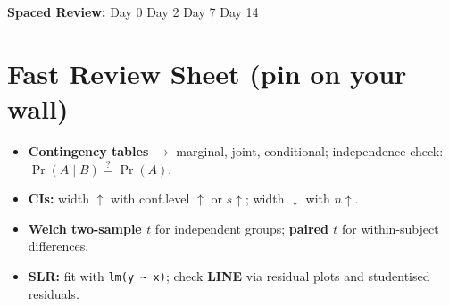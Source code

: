 \documentclass[11pt,a4paper]{article}
\newcommand{\reviewticks}{
  \vspace{0.4em}
  \noindent\scriptsize\textbf{Spaced Review:}
  \fbox{\phantom{D0}} Day 0\quad
  \fbox{\phantom{D2}} Day 2\quad
  \fbox{\phantom{D7}} Day 7\quad
  \fbox{\phantom{D14}} Day 14
}
\begin{document}
\reviewticks

\section*{Fast Review Sheet (pin on your wall)}

\begin{tcolorbox}[colback=SoftBg,colframe=Accent!40!black,breakable,boxrule=0.5pt,arc=2mm]
\begin{itemize}
  \item \textbf{Contingency tables} $\rightarrow$ marginal, joint, conditional; independence check: \( \Pr(A\mid B) \stackrel{?}{=} \Pr(A) \).
  \item \textbf{CIs:} width $\uparrow$ with conf.level $\uparrow$ or $s \uparrow$; width $\downarrow$ with $n \uparrow$.
  \item \textbf{Welch two-sample $t$} for independent groups; \textbf{paired $t$} for within-subject differences.
  \item \textbf{SLR:} fit with \texttt{lm(y \textasciitilde\ x)}; check \textbf{LINE} via residual plots and studentised residuals.
\end{itemize}
\end{tcolorbox}
\end{document}
